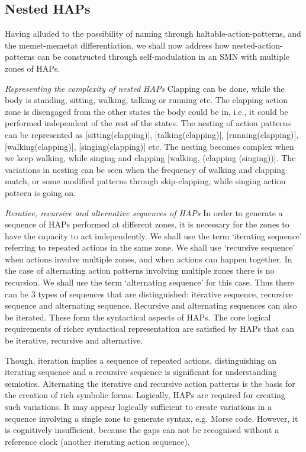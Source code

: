 \subsection{Nested HAPs}

Having alluded to the possibility of naming through haltable-action-patterns, and the memet-memetat differentiation, we shall now address how nested-action-patterns can be constructed through self-modulation in an SMN with multiple zones of HAPs. 

\emph{Representing the complexity of nested HAPs} Clapping can be done, while the body is standing, sitting, walking, talking or running etc. The clapping action zone is disengaged from the other states the body could be in, i.e., it could be performed independent of the rest of the states. The nesting of action patterns can be represented as [sitting(clapping)],  [talking(clapping)],  [running(clapping)],  [walking(clapping)],  [singing(clapping)] etc. The nesting becomes complex when we keep walking, while singing and clapping [walking, (clapping (singing))]. The variations in nesting can be seen when the frequency of walking and clapping match, or some modified patterns through skip-clapping, while singing action pattern is going on. 

\emph{Iterative, recursive and alternative sequences of HAPs} In order to generate a sequence of HAPs performed at different zones, it is necessary for the zones to have the capacity to act independently. We shall use the term `iterating sequence' referring to repeated actions in the same zone. We shall use `recursive sequence' when actions involve multiple zones, and when actions can happen together. In the case of alternating action patterns involving multiple zones there is no recursion. We shall use the term `alternating sequence' for this case. Thus there can be 3 types of sequences that are distinguished:  iterative sequence, recursive sequence and alternating sequence. Recursive and alternating sequences can also be iterated. These form the syntactical aspects of HAPs. The core logical requirements of richer syntactical representation are satisfied by HAPs that can be iterative, recursive and alternative. 

Though, iteration implies a sequence of repeated actions, distinguishing an iterating sequence and a recursive sequence is significant for understanding semiotics. Alternating the iterative and recursive action patterns is the basis for the creation of rich symbolic forms. Logically, HAPs are required for creating such variations. It may appear logically sufficient to create variations in a sequence involving a single zone to generate syntax, e.g. Morse code.  However, it is cognitively insufficient, because the gaps can not be recognised without a reference clock (another iterating action sequence). 


